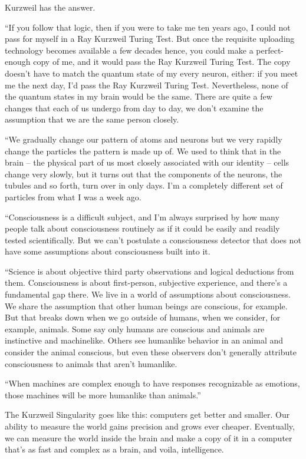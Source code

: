 Kurzweil has the answer.

``If you follow that logic, then if you were to take me ten years
ago, I could not pass for myself in a Ray Kurzweil Turing Test. But
once the requisite uploading technology becomes available a few
decades hence, you could make a perfect-enough copy of me, and it
would pass the Ray Kurzweil Turing Test. The copy doesn't have to
match the quantum state of my every neuron, either: if you meet me
the next day, I'd pass the Ray Kurzweil Turing Test. Nevertheless,
none of the quantum states in my brain would be the same. There are
quite a few changes that each of us undergo from day to day, we
don't examine the assumption that we are the same person closely.

``We gradually change our pattern of atoms and neurons but we very
rapidly change the particles the pattern is made up of. We used to
think that in the brain -- the physical part of us most closely
associated with our identity -- cells change very slowly, but it
turns out that the components of the neurons, the tubules and so
forth, turn over in only days. I'm a completely different set of
particles from what I was a week ago.

``Consciousness is a difficult subject, and I'm always surprised by
how many people talk about consciousness routinely as if it could
be easily and readily tested scientifically. But we can't postulate
a consciousness detector that does not have some assumptions about
consciousness built into it.

``Science is about objective third party observations and logical
deductions from them. Consciousness is about first-person,
subjective experience, and there's a fundamental gap there. We live
in a world of assumptions about consciousness. We share the
assumption that other human beings are conscious, for example. But
that breaks down when we go outside of humans, when we consider,
for example, animals. Some say only humans are conscious and
animals are instinctive and machinelike. Others see humanlike
behavior in an animal and consider the animal conscious, but even
these observers don't generally attribute consciousness to animals
that aren't humanlike.

``When machines are complex enough to have responses recognizable as
emotions, those machines will be more humanlike than animals.''

The Kurzweil Singularity goes like this: computers get better and
smaller. Our ability to measure the world gains precision and grows
ever cheaper. Eventually, we can measure the world inside the brain
and make a copy of it in a computer that's as fast and complex as a
brain, and voila, intelligence.

